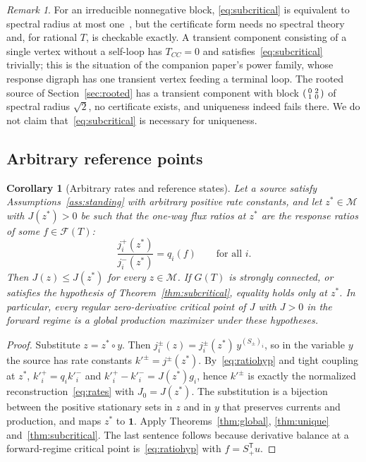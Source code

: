 \documentclass[11pt,a4paper]{article}
\theoremstyle{plain}
\newtheorem{corollary}[theorem]{Corollary}
\theoremstyle{definition}
\theoremstyle{remark}
\newtheorem{remark}[theorem]{Remark}
\numberwithin{equation}{section}
\newcommand{\T}{\mathsf{T}}
\newcommand{\Sp}{S_{+}}
\newcommand{\one}{\mathbf{1}}
\newcommand{\cone}{\mathcal{F}}
\newcommand{\fiber}{\mathcal{M}}
\renewcommand{\odot}{\circ}
\begin{document}
\begin{remark}\label{rem:subcritical}
For an irreducible nonnegative block, \eqref{eq:subcritical} is equivalent to spectral radius at most one~\citep{berman1994}, but the certificate form needs no spectral theory and, for rational $T$, is checkable exactly. A transient component consisting of a single vertex without a self-loop has $T_{CC}=0$ and satisfies~\eqref{eq:subcritical} trivially; this is the situation of the companion paper's power family, whose response digraph has one transient vertex feeding a terminal loop. The rooted source of Section~\ref{sec:rooted} has a transient component with block $\begin{psmallmatrix}0&2\\1&0\end{psmallmatrix}$ of spectral radius $\sqrt2$, no certificate exists, and uniqueness indeed fails there. We do not claim that~\eqref{eq:subcritical} is necessary for uniqueness.
\end{remark}

\subsection{Arbitrary reference points}

\begin{corollary}[Arbitrary rates and reference states]\label{cor:arbitrary}
Let a source satisfy Assumptions~\ref{ass:standing} with arbitrary positive rate constants, and let $z^*\in\fiber$ with $J(z^*)>0$ be such that the one-way flux ratios at $z^*$ are the response ratios of some $f\in\cone(T)$:
\begin{equation}\label{eq:ratiohyp}
 \frac{j^+_i(z^*)}{j^-_i(z^*)}=q_i(f)\qquad\text{for all }i .
\end{equation}
Then $J(z)\le J(z^*)$ for every $z\in\fiber$. If $G(T)$ is strongly connected, or satisfies the hypothesis of Theorem~\ref{thm:subcritical}, equality holds only at $z^*$. In particular, every regular zero-derivative critical point of $J$ with $J>0$ in the forward regime is a global production maximizer under these hypotheses.
\end{corollary}
\begin{proof}
Substitute $z=z^*\odot y$. Then $j^\pm_i(z)=j^\pm_i(z^*)\,y^{(S_\pm)_i}$, so in the variable $y$ the source has rate constants $k'^\pm=j^\pm(z^*)$. By~\eqref{eq:ratiohyp} and tight coupling at $z^*$, $k'^+_i=q_ik'^-_i$ and $k'^+_i-k'^-_i=J(z^*)g_i$, hence $k'^\pm$ is exactly the normalized reconstruction~\eqref{eq:rates} with $J_0=J(z^*)$. The substitution is a bijection between the positive stationary sets in $z$ and in $y$ that preserves currents and production, and maps $z^*$ to $\one$. Apply Theorems~\ref{thm:global}, \ref{thm:unique} and~\ref{thm:subcritical}. The last sentence follows because derivative balance at a forward-regime critical point is~\eqref{eq:ratiohyp} with $f=\Sp^{\T}u$.
\end{proof}
\end{document}
